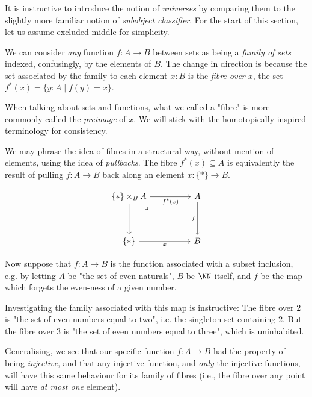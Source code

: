 \begin{node}
%
It is instructive to introduce the notion of \emph{universes} by
comparing them to the slightly more familiar notion of \emph{subobject
classifier}. For the start of this section, let us assume excluded
middle for simplicity.
%
\end{node}

\begin{node}
%
We can consider \emph{any} function \(f : A \to B\) between sets as
being a \emph{family of sets} indexed, confusingly, by the elements of
\(B\).  The change in direction is because the set associated by the
family to each element \(x : B\) is the \emph{fibre over \(x\)}, the set
\(f^*(x) = \{ y : A \mid f(y) = x \}.\)
%
\end{node}

\begin{remark}
When talking about sets and functions, what we called a "fibre" is more
commonly called the \emph{preimage} of \(x\). We will stick with the
homotopically-inspired terminology for consistency.
\end{remark}

\begin{node}
%
We may phrase the idea of fibres in a structural way, without mention of
elements, using the idea of \emph{pullbacks}. The fibre \(f^*(x)
\subseteq A\) is equivalently the result of pulling \(f : A \to B\) back
along an element \(x : \{*\} \to B\).

\[\begin{tikzcd}
  {\{*\} \times_B A} && A \\
  \\
  \{*\} && B
  \arrow["f"', from=1-3, to=3-3]
  \arrow["x"', from=3-1, to=3-3]
  \arrow[from=1-1, to=3-1]
  \arrow["{f^*(x)}"', from=1-1, to=1-3]
  \arrow["\lrcorner"{anchor=center, pos=0.125}, draw=none, from=1-1, to=3-3]
\end{tikzcd}\]
%
\end{node}

\begin{node}
%
Now suppose that \(f : A \to B\) is the function associated with a
subset inclusion, e.g. by letting \(A\) be "the set of even naturals",
\(B\) be \(\NN\) itself, and \(f\) be the map which forgets the
even-ness of a given number.

Investigating the family associated with this map is instructive: The
fibre over \(2\) is "the set of even numbers equal to two", i.e. the
singleton set containing \(2\). But the fibre over \(3\) is "the set of
even numbers equal to three", which is uninhabited.

Generalising, we see that our specific function \(f : A \to B\) had the
property of being \emph{injective}, and that
any injective function, and \emph{only} the injective functions, will
have this same behaviour for its family of fibres (i.e., the fibre over
any point will have \emph{at most one} element).
%
\end{node}

